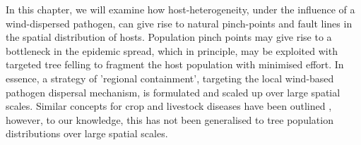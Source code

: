 In this chapter, we will examine how host-heterogeneity, under the influence of a wind-dispersed pathogen, can give rise to natural pinch-points and fault lines in the spatial distribution of hosts. 
Population pinch points may give rise to a bottleneck in the epidemic spread, which in principle, 
may be exploited with targeted tree felling to fragment the host population with minimised effort. 
In essence, a strategy of 'regional containment', targeting the local wind-based pathogen dispersal mechanism, is formulated and scaled up over large spatial scales. Similar concepts for crop and livestock diseases have been outlined \cite{PAPAIX201435, GILIOLI20131, Gilligan-disease-management}, however, to our knowledge, this has not been generalised to tree population distributions over large spatial scales.



